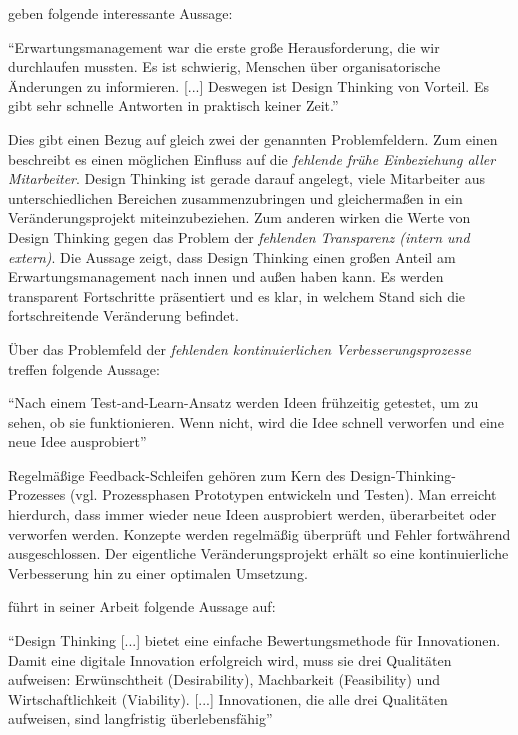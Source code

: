  geben folgende interessante Aussage:

\begin{center}
	``Erwartungsmanagement war die erste große Herausforderung, die wir durchlaufen mussten. Es ist schwierig, Menschen über organisatorische Änderungen zu informieren. [...] Deswegen ist Design Thinking von Vorteil. Es gibt sehr schnelle Antworten in praktisch keiner Zeit.'' \cite{mihelic_embracing_nodate}
\end{center}

Dies gibt einen Bezug auf gleich zwei der genannten Problemfeldern. Zum einen beschreibt es einen möglichen Einfluss auf die \textit{fehlende frühe Einbeziehung aller Mitarbeiter}. Design Thinking ist gerade darauf angelegt, viele Mitarbeiter aus unterschiedlichen Bereichen zusammenzubringen und gleichermaßen in ein Veränderungsprojekt miteinzubeziehen. Zum anderen wirken die Werte von Design Thinking gegen das Problem der \textit{fehlenden Transparenz (intern und extern)}. Die Aussage zeigt, dass Design Thinking einen großen Anteil am Erwartungsmanagement nach innen und außen haben kann. Es werden transparent Fortschritte präsentiert und es klar, in welchem Stand sich die fortschreitende Veränderung befindet.

Über das Problemfeld der \textit{fehlenden kontinuierlichen Verbesserungsprozesse} treffen  folgende Aussage:

\begin{center}
	``Nach einem Test-and-Learn-Ansatz werden Ideen frühzeitig getestet, um zu sehen, ob sie funktionieren. Wenn nicht, wird die Idee schnell verworfen und eine neue Idee ausprobiert'' \cite[S. 369]{urbach_digitalization_2018}
\end{center}

Regelmäßige Feedback-Schleifen gehören zum Kern des Design-Thinking-Prozesses (vgl. Prozessphasen Prototypen entwickeln und Testen). Man erreicht hierdurch, dass immer wieder neue Ideen ausprobiert werden, überarbeitet oder verworfen werden. Konzepte werden regelmäßig überprüft und Fehler fortwährend ausgeschlossen. Der eigentliche Veränderungsprojekt erhält so eine kontinuierliche Verbesserung hin zu einer optimalen Umsetzung.

 führt in seiner Arbeit folgende Aussage auf:

\begin{center}
	``Design Thinking [...] bietet eine einfache Bewertungsmethode für Innovationen. Damit eine digitale Innovation erfolgreich wird, muss sie drei Qualitäten aufweisen: Erwünschtheit (Desirability), Machbarkeit (Feasibility) und Wirtschaftlichkeit (Viability). [...] Innovationen, die alle drei Qualitäten aufweisen, sind langfristig überlebensfähig'' \cite[S. 207f.]{weinreich_lean_2016}
\end{center}

